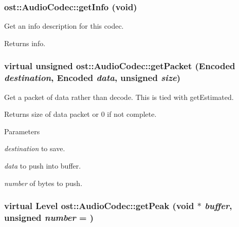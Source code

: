 \subsubsection[{getInfo}]{ ost::AudioCodec::getInfo (void)\hspace{0.3cm}{\ttfamily  [inline]}}\label{classost_1_1_audio_codec_a564e2675bdab8ef4c957bde488c983e5}


Get an info description for this codec. \begin{DoxyReturn}{Returns}
info. 
\end{DoxyReturn}
\subsubsection[{getPacket}]{\setlength{\rightskip}{0pt plus 5cm}virtual unsigned ost::AudioCodec::getPacket ({\bf Encoded} {\em destination}, \/  {\bf Encoded} {\em data}, \/  unsigned {\em size})\hspace{0.3cm}{\ttfamily  [virtual]}}\label{classost_1_1_audio_codec_a760f86f0ace0420992bfa8bc1e8f68cf}


Get a packet of data rather than decode. This is tied with getEstimated.

\begin{DoxyReturn}{Returns}
size of data packet or 0 if not complete. 
\end{DoxyReturn}

\begin{DoxyParams}{Parameters}
\item[{\em destination}]to save. \item[{\em data}]to push into buffer. \item[{\em number}]of bytes to push. \end{DoxyParams}
\subsubsection[{getPeak}]{\setlength{\rightskip}{0pt plus 5cm}virtual {\bf Level} ost::AudioCodec::getPeak (void $\ast$ {\em buffer}, \/  unsigned {\em number} = {})\hspace{0.3cm}{\ttfamily  [virtual]}}\label{classost_1_1_audio_codec_a921946adef4203b24ba21ede710cfeb5}


